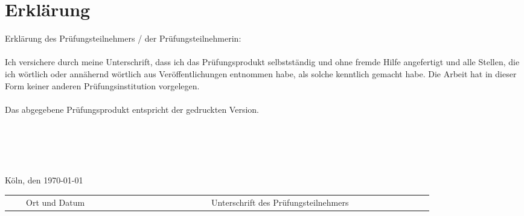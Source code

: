 \chapter{Erklärung}
Erklärung des Prüfungsteilnehmers / der Prüfungsteilnehmerin:
\\
\\
Ich versichere durch meine Unterschrift, dass ich das Prüfungsprodukt selbstständig und ohne fremde Hilfe angefertigt und alle Stellen, die ich wörtlich oder annähernd wörtlich aus Veröffentlichungen entnommen habe, als solche kenntlich gemacht habe. Die Arbeit hat in dieser Form keiner anderen Prüfungsinstitution vorgelegen.
\\
\\
Das abgegebene Prüfungsprodukt entspricht der gedruckten Version.
\\
\\
\\
\\
\\
\\\small{Köln, den \today}\\
\begin{tabular}{r r r r r r r r r r r r r r r r r r r r r r r r r r r}
\cline{1-5} \cline{12-25}\\[-0.3cm]
& &\tiny{Ort und Datum}& & & & & & & & & & & & & & &\tiny{Unterschrift des Prüfungsteilnehmers}& & & & & & &\\
\end{tabular}
\cleardoublepage